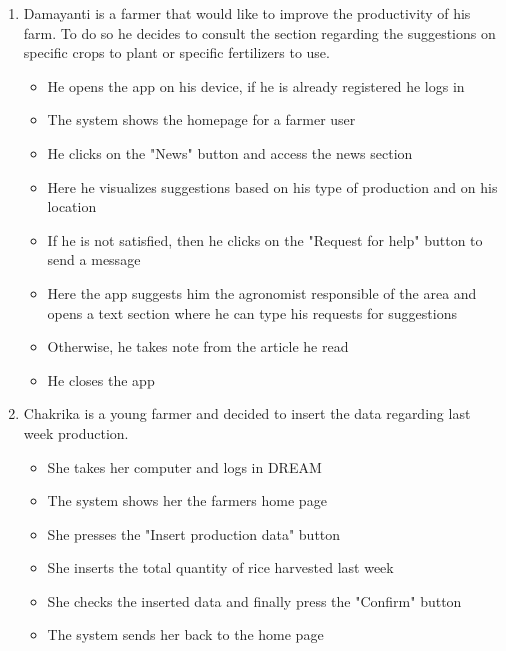 \documentclass[table, 12pt]{article}
\begin{document}
\begin{enumerate}
    \item Damayanti is a farmer that would like to improve the productivity of his farm.
    To do so he decides to consult the section regarding the suggestions on specific crops to plant or specific fertilizers to use.
    \begin{itemize}
        \item He opens the app on his device, if he is already registered he logs in
        \item The system shows the homepage for a farmer user
        \item He clicks on the "News" button and access the news section
        \item Here he visualizes suggestions based on his type of production and on his location
        \item If he is not satisfied, then he clicks on the "Request for help" button to send a message
        \item Here the app suggests him the agronomist responsible of the area and opens a text section where he can type his requests for suggestions
        \item Otherwise, he takes note from the article he read
        \item He closes the app
    \end{itemize}

    \item Chakrika is a young farmer and decided to insert the data regarding last week production.
    \begin{itemize}
        \item She takes her computer and logs in DREAM
        \item The system shows her the farmers home page
        \item She presses the "Insert production data" button
        \item She inserts the total quantity of rice harvested last week 
        \item She checks the inserted data and finally press the "Confirm" button 
        \item The system sends her back to the home page
    \end{itemize}


\end{enumerate}
\end{document}
